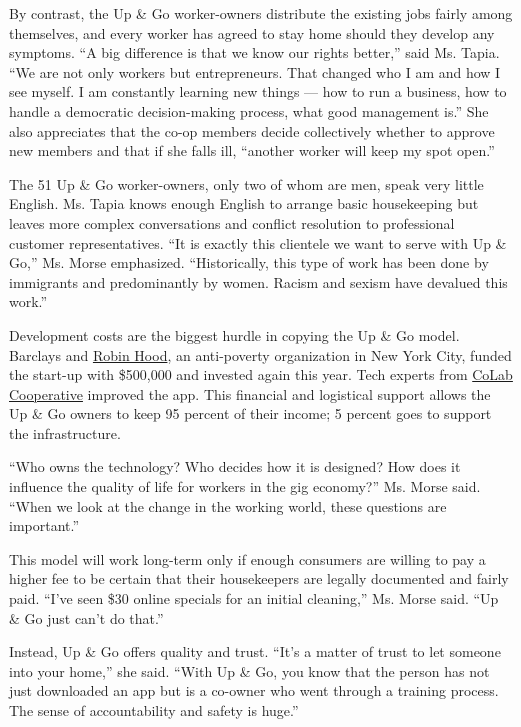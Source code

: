 By contrast, the Up \& Go worker-owners distribute the existing jobs
fairly among themselves, and every worker has agreed to stay home should
they develop any symptoms. ``A big difference is that we know our rights
better,'' said Ms. Tapia. ``We are not only workers but entrepreneurs.
That changed who I am and how I see myself. I am constantly learning new
things --- how to run a business, how to handle a democratic
decision-making process, what good management is.'' She also appreciates
that the co-op members decide collectively whether to approve new
members and that if she falls ill, ``another worker will keep my spot
open.''

The 51 Up \& Go worker-owners, only two of whom are men, speak very
little English. Ms. Tapia knows enough English to arrange basic
housekeeping but leaves more complex conversations and conflict
resolution to professional customer representatives. ``It is exactly
this clientele we want to serve with Up \& Go,'' Ms. Morse emphasized.
``Historically, this type of work has been done by immigrants and
predominantly by women. Racism and sexism have devalued this work.''

Development costs are the biggest hurdle in copying the Up \& Go model.
Barclays and \href{https://www.robinhood.org/}{Robin Hood}, an
anti-poverty organization in New York City, funded the start-up with
\$500,000 and invested again this year. Tech experts from
\href{https://colab.coop/}{CoLab Cooperative} improved the app. This
financial and logistical support allows the Up \& Go owners to keep 95
percent of their income; 5 percent goes to support the infrastructure.

``Who owns the technology? Who decides how it is designed? How does it
influence the quality of life for workers in the gig economy?'' Ms.
Morse said. ``When we look at the change in the working world, these
questions are important.''

This model will work long-term only if enough consumers are willing to
pay a higher fee to be certain that their housekeepers are legally
documented and fairly paid. ``I've seen \$30 online specials for an
initial cleaning,'' Ms. Morse said. ``Up \& Go just can't do that.''

Instead, Up \& Go offers quality and trust. ``It's a matter of trust to
let someone into your home,'' she said. ``With Up \& Go, you know that
the person has not just downloaded an app but is a co-owner who went
through a training process. The sense of accountability and safety is
huge.''

